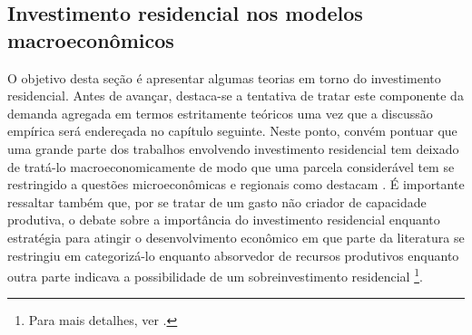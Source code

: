 \subsection{Investimento residencial nos modelos macroeconômicos}
\label{RevResidencial}

O objetivo desta seção é apresentar algumas teorias em torno do investimento residencial. 
Antes de avançar, destaca-se a tentativa de tratar este componente da demanda agregada em termos estritamente teóricos uma vez que a discussão empírica será endereçada no capítulo seguinte. 
Neste ponto, convém pontuar que uma grande parte dos trabalhos envolvendo investimento residencial tem deixado de tratá-lo macroeconomicamente de modo que uma parcela considerável tem se restringido a questões microeconômicas e regionais como destacam \textcite{arestis_u.s._2008}.
É importante ressaltar também que, por se tratar de um gasto não criador de capacidade produtiva, o debate sobre a importância do investimento residencial enquanto estratégia para atingir o desenvolvimento econômico em que parte da literatura se restringiu em categorizá-lo enquanto absorvedor de recursos produtivos \cite{solow_importance_1995} enquanto outra parte indicava  a possibilidade de um sobreinvestimento residencial \cite{mills_has_1987}\footnote{Para mais detalhes, ver \textcite{arku_housing_2006}.}.

